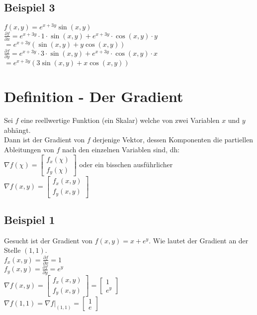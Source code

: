 \documentclass[../main.tex]{subfiles}
\begin{document}
\subsection{Beispiel 3}
$f(x,y)=e^{x+3y}\sin(x,y)$ \\ [7pt]
$\frac{\partial f}{\partial x} = e^{x+3y}\cdot 1\cdot \sin(x,y) + e^{x+3y}\cdot \cos(x,y) \cdot y$
$=e^{x+3y}(\sin(x,y)+y\cos(x,y))$ \\
$\frac{\partial f}{\partial y}= e^{x+3y}\cdot 3\cdot \sin(x,y) + e^{x+3y}\cdot \cos(x,y) \cdot x$
$=e^{x+3y}(3\sin(x,y)+x\cos(x,y))$ 

\section{Definition - Der Gradient}
Sei $f$ eine reellwertige Funktion (ein Skalar) welche von zwei Variablen $x$ und $y$ abhängt. \\
Dann ist der Gradient von $f$ derjenige Vektor, dessen Komponenten die partiellen Ableitungen 
von $f$ nach den einzelnen Variablen sind, dh: \\ [7pt]
$\nabla f(\chi)=\begin{bmatrix}f_x(\chi) \\f_y(\chi)\end{bmatrix}$ oder ein bisschen ausführlicher
$\nabla f(x,y)=\begin{bmatrix}f_x(x,y) \\f_y(x,y)\end{bmatrix}$

\subsection{Beispiel 1}
Gesucht ist der Gradient von $f(x,y)=x+e^y$. Wie lautet der Gradient an der Stelle $(1,1)$. \\ [7pt]
$f_x(x,y)=\frac{\partial f}{\partial x}=1$ \\ [7pt]
$f_y(x,y)=\frac{\partial f}{\partial y}=e^y$ \\ [7pt]
$\nabla f(x,y)=\begin{bmatrix}f_x(x,y) \\f_y(x,y)\end{bmatrix} = \begin{bmatrix}1 \\e^y\end{bmatrix}$ \\ [7pt]
$\nabla f(1,1)=\nabla f|_{(1,1)}=\begin{bmatrix}1 \\e\end{bmatrix}$
\end{document}
